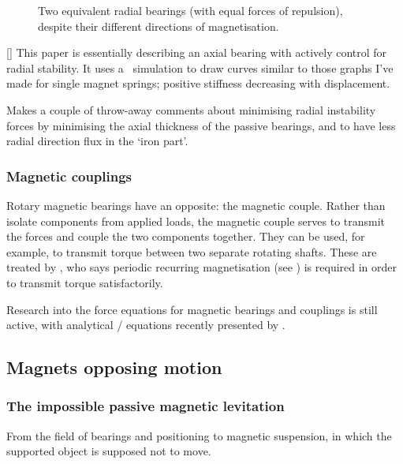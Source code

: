 \begin{figure}[hbtp]
  \caption[Two equivalent radial bearings]{Two equivalent radial bearings
(with equal forces of repulsion), despite their different directions of
magnetisation.}
\end{figure}

[\textcite{asami2005}] This paper is essentially describing an axial
bearing with actively control for radial stability. It uses a \FEA\ simulation
to draw curves similar to those graphs I've made for single magnet springs;
positive stiffness decreasing with displacement.

Makes a couple of throw-away comments about minimising radial instability
forces by minimising the axial thickness of the passive bearings, and to have
less radial direction flux in the `iron part'.


\subsubsection{Magnetic couplings}

Rotary magnetic bearings have an opposite: the magnetic couple. Rather
than isolate components from applied loads, the magnetic couple serves
to transmit the forces and couple the two components together. They
can be used, for example, to transmit torque between two separate
rotating shafts. These are treated by \textcite{yonnet1981}, who says
periodic recurring magnetisation (see ) is required in
order to transmit torque satisfactorily.

\cite{bucher2006}

Research into the force equations for magnetic bearings and couplings is still active, with analytical \threeD/ equations recently presented by \textcite{ravaud2009}.



\subsection{Magnets opposing motion}

\subsubsection{The impossible passive magnetic levitation}

From the field of bearings and positioning to magnetic suspension, in which the supported object is supposed not to move.

